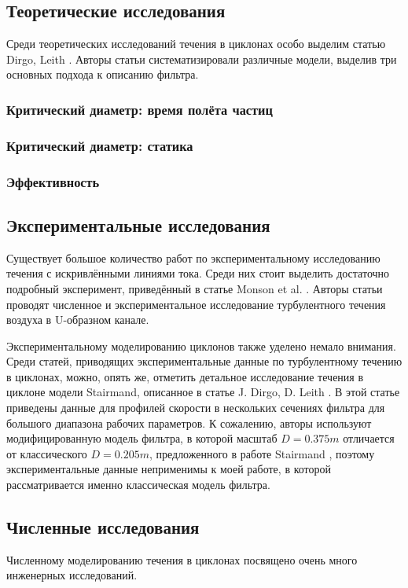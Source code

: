 	\subsection{Теоретические исследования}
		\hspace{1em}
		Среди теоретических исследований течения в циклонах особо выделим статью Dirgo, Leith \cite{DirgoLeith}. Авторы статьи систематизировали различные модели, выделив три основных подхода к описанию фильтра.
			\subsubsection{Критический диаметр: время полёта частиц}
			\subsubsection{Критический диаметр: статика}
			\subsubsection{Эффективность}
	\subsection{Экспериментальные исследования}
		\hspace{1em}Существует большое количество работ по экспериментальному исследованию течения с искривлёнными линиями тока. Среди них стоит выделить достаточно подробный эксперимент, приведённый в статье Monson et al. \cite{Monson}. Авторы статьи проводят численное и экспериментальное исследование турбулентного течения воздуха в U-образном канале.
		
		Экспериментальному моделированию циклонов также уделено немало внимания. Среди статей, приводящих экспериментальные данные по турбулентному течению в циклонах, можно, опять же, отметить детальное исследование течения в циклоне модели Stairmand, описанное в статье J. Dirgo, D. Leith \cite{DirgoLeith}. В этой статье приведены данные для профилей скорости в нескольких сечениях фильтра для большого диапазона рабочих параметров. К сожалению, авторы используют модифицированную модель фильтра, в которой масштаб $D = 0.375m$ отличается от классического $D = 0.205m$, предложенного в работе Stairmand \cite{Stairmand}, поэтому экспериментальные данные неприменимы к моей работе, в которой рассматривается именно классическая модель фильтра.
	\subsection{Численные исследования}
		\hspace{2em}Численному моделированию течения в циклонах посвящено очень много инженерных исследований.
\newpage
